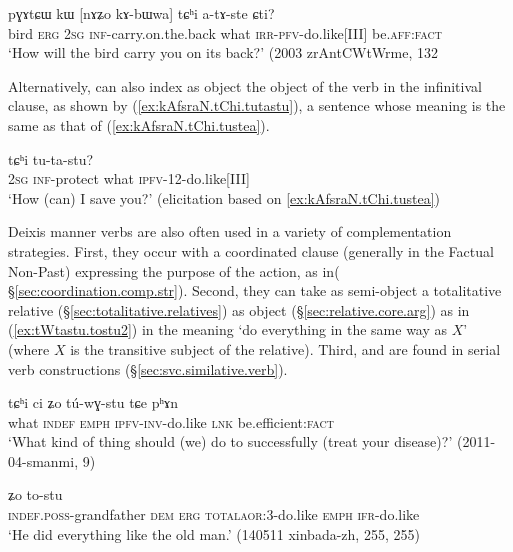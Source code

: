  \begin{exe}
\ex \label{ex:kAbWwa.tChi.atAste}
\gll pɣɤtɕɯ kɯ [nɤʑo kɤ-bɯwa] tɕʰi a-tɤ-ste ɕti? \\
bird \textsc{erg} \textsc{2sg} \textsc{inf}-carry.on.the.back what \textsc{irr}-\textsc{pfv}-do.like[III] be.\textsc{aff}:\textsc{fact} \\
\glt `How will the bird carry you on its back?' (2003 zrAntCWtWrme, 132
\end{exe} 


Alternatively,  can also index as object the object of the verb in the infinitival clause, as shown by (\ref{ex:kAfsraN.tChi.tutastu}), a sentence whose meaning is the same as that of (\ref{ex:kAfsraN.tChi.tustea}).

 \begin{exe}
\ex \label{ex:kAfsraN.tChi.tutastu}
 tɕʰi tu-ta-stu? \\
\textsc{2sg} \textsc{inf}-protect what \textsc{ipfv}-1\fl{}2-do.like[III]  \\
\glt `How (can) I save you?' (elicitation based on \ref{ex:kAfsraN.tChi.tustea})
\end{exe} 

Deixis manner verbs are also often used in a variety of complementation strategies. First, they occur with a coordinated clause (generally in the Factual Non-Past) expressing the purpose of the action, as in( §\ref{sec:coordination.comp.str}). Second, they can take as semi-object a totalitative relative (§\ref{sec:totalitative.relatives}) as object (§\ref{sec:relative.core.arg}) as in (\ref{ex:tWtastu.tostu2}) in the meaning `do everything in the same way as $X$' (where $X$ is the transitive subject of the relative). Third,  and  are found in serial verb constructions (§\ref{sec:svc.similative.verb}).

 \begin{exe}
\ex \label{ex:tChi.tuwGstu}
\gll tɕʰi ci ʑo tú-wɣ-stu tɕe pʰɤn \\
what \textsc{indef} \textsc{emph} \textsc{ipfv}-\textsc{inv}-do.like \textsc{lnk} be.efficient:\textsc{fact} \\
\glt `What kind of thing should (we) do to successfully (treat your disease)?' (2011-04-smanmi, 9)
\end{exe} 

\begin{exe}
\ex \label{ex:tWtastu.tostu2}
 ʑo to-stu \\
\textsc{indef}.\textsc{poss}-grandfather \textsc{dem} \textsc{erg} \textsc{total}\redp{}\textsc{aor}:3\flobv{}-do.like \textsc{emph} \textsc{ifr}-do.like  \\
\glt `He did everything like the old man.' (140511 xinbada-zh, 255, 255)
\end{exe}

